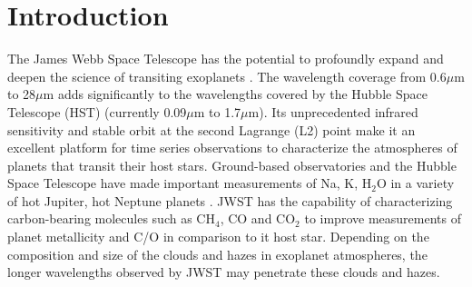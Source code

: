 \documentclass[iop]{emulateapj}
\begin{document}



\section{Introduction}

The James Webb Space Telescope \citep[JWST; e.g.][]{gardner2006SSRv} has the potential to profoundly expand and deepen the science of transiting exoplanets \citep[e.g.][]{greene2016jwst_trans}.
The wavelength coverage from 0.6$\mu$m to 28$\mu$m adds significantly to the wavelengths covered by the Hubble Space Telescope (HST) (currently 0.09$\mu$m to 1.7$\mu$m).
Its unprecedented infrared sensitivity and stable orbit at the second Lagrange (L2) point make it an excellent platform for time series observations to characterize the atmospheres of planets that transit their host stars.
Ground-based observatories and the Hubble Space Telescope have made important measurements of Na, K, H$_2$O in a variety of hot Jupiter, hot Neptune planets \cite[e.g.][]{snellen2008Na209,kreidberg2014wasp43,fraine2014hatp11,deming13,sing2016continuum}.
JWST has the capability of characterizing carbon-bearing molecules such as CH$_4$, CO and CO$_2$ to improve measurements of planet metallicity and C/O in comparison to it host star.
Depending on the composition and size of the clouds and hazes in exoplanet atmospheres, the longer wavelengths observed by JWST may penetrate these clouds and hazes.
\end{document}

